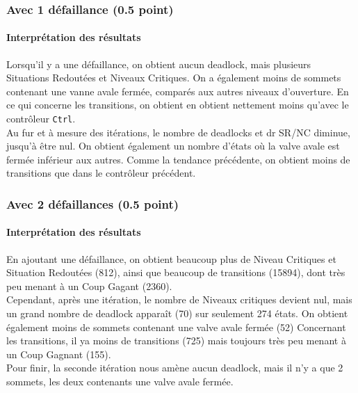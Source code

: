 \documentclass[a4paper]{book}
\begin{document}
\subsubsection{Avec 1 défaillance (0.5 point)}





\paragraph{Interprétation des résultats}
Lorsqu'il y a une défaillance, on obtient aucun deadlock, mais plusieurs Situations Redoutées et Niveaux Critiques. 
On a également moins de sommets contenant une vanne avale fermée, comparés aux autres niveaux d'ouverture. En ce qui concerne les 
transitions, on obtient en obtient nettement moins qu'avec le contrôleur {\tt Ctrl}. \\
Au fur et à mesure des itérations, le nombre de deadlocks et dr SR/NC diminue, jusqu'à être nul. On obtient également un nombre d'états où la valve avale est fermée
inférieur aux autres. Comme la tendance précédente, on obtient moins de transitions que dans le contrôleur précédent.

\subsubsection{Avec 2 défaillances (0.5 point)}




%
\paragraph{Interprétation des résultats}
En ajoutant une défaillance, on obtient beaucoup plus de Niveau Critiques et 
Situation Redoutées (812), ainsi que beaucoup de transitions (15894), dont très peu menant à un Coup Gagant (2360). \\
Cependant, après une itération, le nombre de Niveaux critiques devient nul, mais un grand nombre de deadlock apparaît (70)
sur seulement 274 états. On obtient également moins de sommets contenant une valve avale fermée (52)
Concernant les transitions, il ya moins de transitions (725) mais toujours très peu menant à un Coup Gagnant (155).\\
Pour finir, la seconde itération nous amène aucun deadlock, mais il n'y a que 2 sommets, les deux contenants une valve avale fermée.
\end{document}
